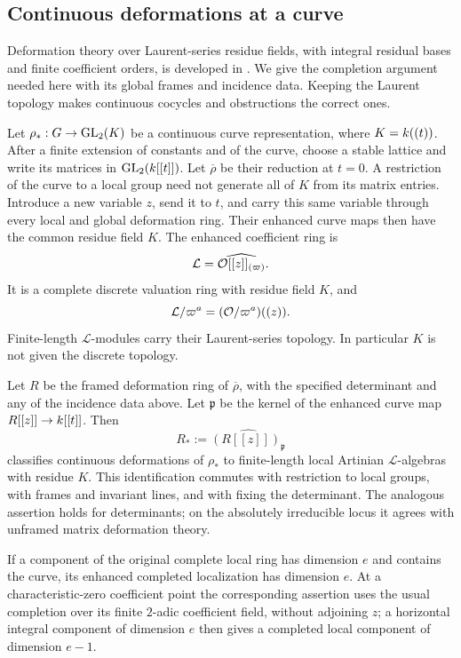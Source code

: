 \subsection{Continuous deformations at a curve}

Deformation theory over Laurent-series residue fields, with integral
residual bases and finite coefficient orders, is developed in
\cite[Section~3.5, Proposition~3.34 and Lemmas~3.35--3.37]{BIP}.
We give the completion argument needed here with its global frames
and incidence data. Keeping the Laurent topology makes continuous
cocycles and obstructions the correct ones.

Let $\rho_*:G\to\operatorname{GL}_2(K)$ be a continuous curve representation, where
$K=k((t))$.  After a finite extension of constants and of the curve,
choose a stable lattice and write its matrices in $\operatorname{GL}_2(k[[t]])$.
Let $\overline\rho$ be their reduction at $t=0$.  A restriction of the
curve to a local group need not generate all of $K$ from its matrix
entries. Introduce a new variable $z$, send it to $t$, and carry this
same variable through every local and global deformation ring. Their
enhanced curve maps then have the common residue field $K$.
The enhanced coefficient ring is
\[
\mathcal L=\widehat{\mathcal O[[z]]_{(\varpi)}}.
\]
It is a complete discrete valuation ring with residue field $K$, and
\[
\mathcal L/\varpi^a=(\mathcal O/\varpi^a)((z)).
\]
Finite-length $\mathcal L$-modules carry their Laurent-series topology.
In particular $K$ is not given the discrete topology.

\begin{lemma}\label{lem:curve-completion}
Let $R$ be the framed deformation ring of $\overline\rho$, with the
specified determinant and any of the incidence data above.  Let
$\mathfrak p$ be the kernel of the enhanced curve map
$R[[z]]\to k[[t]]$.  Then
\[
R_*:=\widehat{(R[[z]])_{\mathfrak p}}
\]
classifies continuous deformations of $\rho_*$ to finite-length local
Artinian $\mathcal L$-algebras with residue $K$.  This identification
commutes with restriction to local groups, with frames and invariant
lines, and with fixing the determinant.  The analogous assertion holds
for determinants; on the absolutely irreducible locus it agrees with
unframed matrix deformation theory.

If a component of the original complete local ring has dimension $e$
and contains the curve, its enhanced completed localization has
dimension $e$.  At a characteristic-zero coefficient point the
corresponding assertion uses the usual completion over its finite
$2$-adic coefficient field, without adjoining $z$; a horizontal
integral component of dimension $e$ then gives a completed local
component of dimension $e-1$.
\end{lemma}

